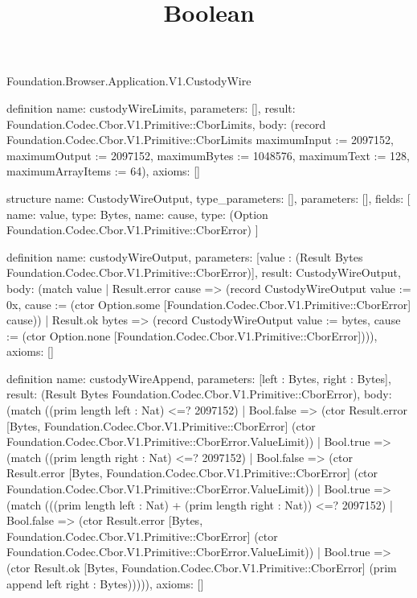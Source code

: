 \begin{lexlean}{Foundation.Browser.Application.V1.CustodyWire}
\title{Boolean}
\begin{semanticmodule}
definition{
  name: custodyWireLimits,
  parameters: [],
  result: Foundation.Codec.Cbor.V1.Primitive::CborLimits,
  body: (record Foundation.Codec.Cbor.V1.Primitive::CborLimits {maximumInput := 2097152, maximumOutput := 2097152, maximumBytes := 1048576, maximumText := 128, maximumArrayItems := 64}),
  axioms: []
}

structure{
  name: CustodyWireOutput,
  type_parameters: [],
  parameters: [],
  fields: [
    {name: value, type: Bytes},
    {name: cause, type: (Option Foundation.Codec.Cbor.V1.Primitive::CborError)}
  ]
}

definition{
  name: custodyWireOutput,
  parameters: [value : (Result Bytes Foundation.Codec.Cbor.V1.Primitive::CborError)],
  result: CustodyWireOutput,
  body: (match value
    | Result.error cause => (record CustodyWireOutput {value := 0x, cause := (ctor Option.some [Foundation.Codec.Cbor.V1.Primitive::CborError] cause)})
    | Result.ok bytes => (record CustodyWireOutput {value := bytes, cause := (ctor Option.none [Foundation.Codec.Cbor.V1.Primitive::CborError])})),
  axioms: []
}

definition{
  name: custodyWireAppend,
  parameters: [left : Bytes, right : Bytes],
  result: (Result Bytes Foundation.Codec.Cbor.V1.Primitive::CborError),
  body: (match ((prim length left : Nat) <=? 2097152)
    | Bool.false => (ctor Result.error [Bytes, Foundation.Codec.Cbor.V1.Primitive::CborError] (ctor Foundation.Codec.Cbor.V1.Primitive::CborError.ValueLimit))
    | Bool.true => (match ((prim length right : Nat) <=? 2097152)
      | Bool.false => (ctor Result.error [Bytes, Foundation.Codec.Cbor.V1.Primitive::CborError] (ctor Foundation.Codec.Cbor.V1.Primitive::CborError.ValueLimit))
      | Bool.true => (match (((prim length left : Nat) + (prim length right : Nat)) <=? 2097152)
        | Bool.false => (ctor Result.error [Bytes, Foundation.Codec.Cbor.V1.Primitive::CborError] (ctor Foundation.Codec.Cbor.V1.Primitive::CborError.ValueLimit))
        | Bool.true => (ctor Result.ok [Bytes, Foundation.Codec.Cbor.V1.Primitive::CborError] (prim append left right : Bytes))))),
  axioms: []
}


\end{semanticmodule}
\end{lexlean}
